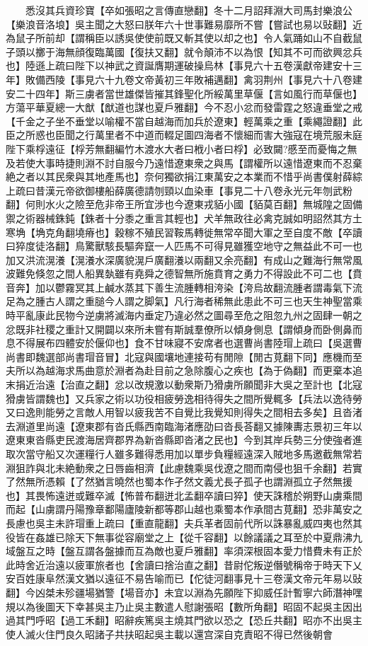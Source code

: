 　　悉沒其兵資珍寶【卒如張昭之言傳直戀翻】冬十二月詔拜淵大司馬封樂浪公【樂浪音洛埌】吳主聞之大怒曰朕年六十世事難易靡所不嘗【嘗試也易以䜴翻】近為鼠子所前却【謂稱臣以誘吳使使前既又斬其使以却之也】令人氣踊如山不自截鼠子頭以擲于海無顔復臨萬國【復扶又翻】就令顛沛不以為恨【知其不可而欲興忿兵也】陸遜上疏曰陛下以神武之資誕膺期運破操烏林【事見六十五卷漢獻帝建安十三年】敗備西陵【事見六十九卷文帝黃初三年敗補邁翻】禽羽荆州【事見六十八卷建安二十四年】斯三虜者當世雄傑皆摧其鋒聖化所綏萬里草偃【言如風行而草偃也】方蕩平華夏總一大猷【猷道也謀也夏戶雅翻】今不忍小忿而發雷霆之怒違垂堂之戒【千金之子坐不垂堂以喻權不當自越海而加兵於遼東】輕萬乘之重【乘繩證翻】此臣之所惑也臣聞之行萬里者不中道而輟足圖四海者不懷細而害大強寇在境荒服未庭陛下乘桴遠征【桴芳無翻編竹木渡水大者曰栰小者曰桴】必致闚?慼至而憂悔之無及若使大事時捷則淵不討自服今乃遠惜遼東衆之與馬【謂權所以遠惜遼東而不忍棄絶之者以其民衆與其地產馬也】奈何獨欲捐江東萬安之本業而不惜乎尚書僕射薛綜上疏曰昔漢元帝欲御樓船薛廣德請刎頸以血染車【事見二十八卷永光元年刎武粉翻】何則水火之險至危非帝王所宜涉也今遼東戎貊小國【貊莫百翻】無城隍之固備禦之術器械銖鈍【銖者十分黍之重言其輕也】犬羊無政往必禽克誠如明詔然其方土寒埆【埆克角翻墝瘠也】穀稼不殖民習鞍馬轉徙無常卒聞大軍之至自度不敵【卒讀曰猝度徒洛翻】鳥驚獸駭長驅奔竄一人匹馬不可得見雖獲空地守之無益此不可一也加又洪流滉瀁【滉瀁水深廣貌滉戶廣翻瀁以兩翻又余亮翻】有成山之難海行無常風波難免倏忽之間人船異埶雖有堯舜之德智無所施賁育之勇力不得設此不可二也【賁音奔】加以鬱霧冥其上鹹水蒸其下善生流腫轉相洿染【洿烏故翻流腫者謂毒氣下流足為之腫古人謂之重膇今人謂之脚氣】凡行海者稀無此患此不可三也天生神聖當乘時平亂康此民物今逆虜將滅海内垂定乃違必然之圖尋至危之阻忽九州之固肆一朝之忿既非社稷之重計又開闢以來所未嘗有斯誠羣僚所以傾身側息【謂傾身而卧側鼻而息不得展布四體安於偃仰也】食不甘味寢不安席者也選曹尚書陸瑁上疏曰【吳選曹尚書即魏選部尚書瑁音冒】北寇與國壤地連接苟有閒隙【閒古莧翻下同】應機而至夫所以為越海求馬曲意於淵者為赴目前之急除腹心之疾也【為于偽翻】而更棄本追末捐近治遠【治直之翻】忿以改規激以動衆斯乃猾虜所願聞非大吳之至計也【北寇猾虜皆謂魏也】又兵家之術以功役相疲勞逸相待得失之間所覺輒多【兵法以逸待勞又曰逸則能勞之言敵人用智以疲我苦不自覺比我覺知則得失之間相去多矣】且沓渚去淵道里尚遠【遼東郡有沓氏縣西南臨海渚應劭曰沓長荅翻又據陳夀志景初三年以遼東東沓縣吏民渡海居齊郡界為新沓縣即沓渚之民也】今到其岸兵勢三分使強者進取次當守船又次運糧行人雖多難得悉用加以單步負糧經遠深入賊地多馬邀截無常若淵狙詐與北未絶動衆之日唇齒相濟【此慮魏乘吳伐遼之間而南侵也狙千余翻】若實了然無所憑賴【了然猶言曉然也蜀本作孑然文義尤長孑孤孑也謂淵孤立孑然無援也】其畏怖遠迸或難卒滅【怖普布翻迸北孟翻卒讀曰猝】使天誅稽於朔野山虜乘間而起【山虜謂丹陽豫章鄱陽廬陵新都等郡山越也乘蜀本作承間古莧翻】恐非萬安之長慮也吳主未許瑁重上疏曰【重直龍翻】夫兵革者固前代所以誅暴亂威四夷也然其役皆在姦雄已除天下無事從容廟堂之上【從千容翻】以餘議議之耳至於中夏鼎沸九域盤互之時【盤互謂各盤據而互為敵也夏戶雅翻】率須深根固本愛力惜費未有正於此時舍近治遠以疲軍旅者也【舍讀曰捨治直之翻】昔尉佗叛逆僭號稱帝于時天下乂安百姓康阜然漢文猶以遠征不易告喻而已【佗徒河翻事見十三卷漢文帝元年易以䜴翻】今凶桀未殄疆場猶警【場音亦】未宜以淵為先願陛下抑威任計暫寧六師潛神嘿規以為後圖天下幸甚吳主乃止吳主數遣人慰謝張昭【數所角翻】昭固不起吳主因出過其門呼昭【過工禾翻】昭辭疾篤吳主燒其門欲以恐之【恐丘共翻】昭亦不出吳主使人滅火住門良久昭諸子共扶昭起吳主載以還宫深自克責昭不得已然後朝會